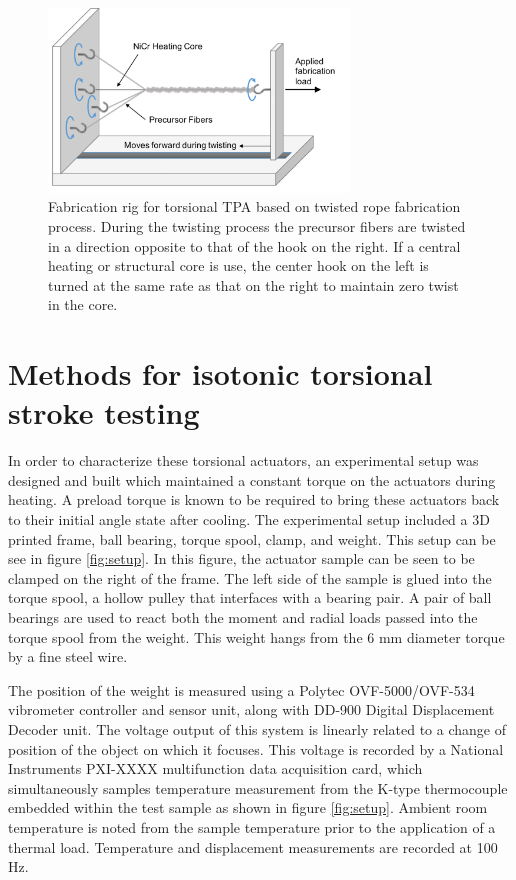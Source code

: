 \documentclass[twocolumn,10pt]{asme2e}
\begin{document}
\begin{figure}
    \centering
        \includegraphics[width=8cm]{../Images/coiling_rig.pdf}
        \caption{Fabrication rig for torsional TPA based on twisted rope fabrication process. During the twisting process the precursor fibers are twisted in a direction opposite to that of the hook on the right. If a central heating or structural core is use, the center hook on the left is turned at the same rate as that on the right to maintain zero twist in the core. }
        \label{fig:coiled}
\end{figure}

\section{Methods for isotonic torsional stroke testing}
In order to characterize these torsional actuators, an experimental setup was designed and built which maintained a constant torque on the actuators during heating. A preload torque is known to be required to bring these actuators back to their initial angle state after cooling. The experimental setup included a 3D printed frame, ball bearing, torque spool, clamp, and weight. This setup can be see in figure \ref{fig:setup}. In this figure, the actuator sample can be seen to be clamped on the right of the frame. The left side of the sample is glued into the torque spool, a hollow pulley that interfaces with a bearing pair. A pair of ball bearings are used to react both the moment and radial loads passed into the torque spool from the weight. This weight hangs from the 6 mm diameter torque by a fine steel wire. 

The position of the weight is measured using a Polytec OVF-5000/OVF-534 vibrometer controller and sensor unit, along with DD-900 Digital Displacement Decoder unit. The voltage output of this system is linearly related to a change of position of the object on which it focuses. This voltage is recorded by a National Instruments PXI-XXXX multifunction data acquisition card, which simultaneously samples temperature measurement from the K-type thermocouple embedded within the test sample as shown in figure \ref{fig:setup}. Ambient room temperature is noted from the sample temperature prior to the application of a thermal load. Temperature and displacement measurements are recorded at 100 Hz. 
\end{document}
